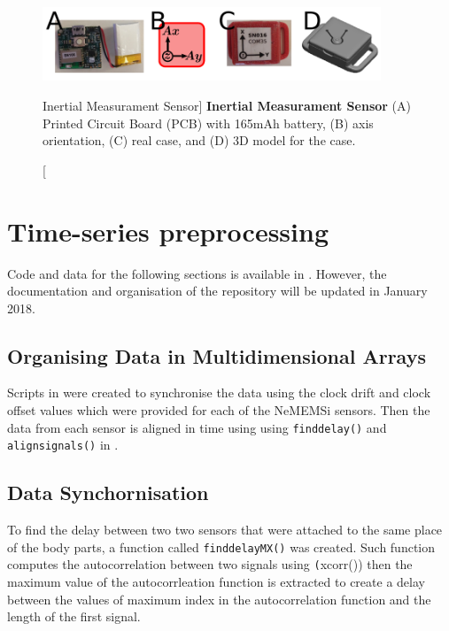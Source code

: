 \begin{figure}
 \centering
   \includegraphics[width=0.9\textwidth]{muse}
   \caption
	[Inertial Measurament Sensor]{
	{\bf Inertial Measurament Sensor}
		(A) Printed Circuit Board (PCB) with 165mAh battery,
		(B) axis orientation, 
		(C) real case, and 
		(D) 3D model for the case.
}
   \label{fig:muse}
\end{figure}

\section{Time-series preprocessing}

Code and data for the following sections is available in 
\citep{hwum2018}. However, the documentation and organisation of the 
repository will be updated in January 2018.

\subsection{Organising Data in Multidimensional Arrays}
Scripts in \MATLAB were created to synchronise the data using the clock 
drift and clock offset values which were provided for each of the 
NeMEMSi sensors. Then the data from each sensor is aligned in 
time using using \texttt{finddelay()} and \texttt{alignsignals()} 
in \MATLAB.


\subsection{Data Synchornisation}
To find the delay between two two sensors that were attached to the same place
of the body parts, a function called  \texttt{finddelayMX()} was created.
Such function computes the autocorrelation between two signals using 
\texttt(xcorr())
then the maximum value of the autocorrleation function is extracted
to create a delay between the values of maximum index in the autocorrelation
function and the length of the first signal.

